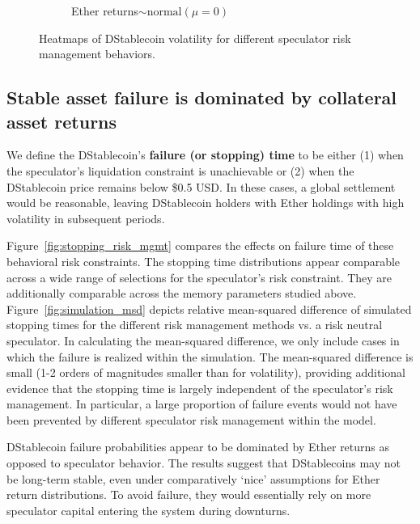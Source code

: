 \begin{figure}
\begin{subfigure}[b]{0.49\textwidth}
		\caption{Ether returns$\sim\text{normal}(\mu=0)$}\label{fig:hist_vol_risk_mgmt_normal}
	\end{subfigure}
	\caption{Heatmaps of DStablecoin volatility for different speculator risk management behaviors.}\label{fig:vol_risk_mgmt}
\end{figure}






\subsection{Stable asset failure is dominated by collateral asset returns}
We define the DStablecoin's \textbf{failure (or stopping) time} to be either (1) when the speculator's liquidation constraint is unachievable or (2) when the DStablecoin price remains below \$0.5 USD. In these cases, a global settlement would be reasonable, leaving DStablecoin holders with Ether holdings with high volatility in subsequent periods.

Figure~\ref{fig:stopping_risk_mgmt} compares the effects on failure time of these behavioral risk constraints. The stopping time distributions appear comparable across a wide range of selections for the speculator's risk constraint. They are additionally comparable across the memory parameters studied above. Figure~\ref{fig:simulation_msd} depicts relative mean-squared difference of simulated stopping times for the different risk management methods vs. a risk neutral speculator. In calculating the mean-squared difference, we only include cases in which the failure is realized within the simulation. The mean-squared difference is small (1-2 orders of magnitudes smaller than for volatility), providing additional evidence that the stopping time is largely independent of the speculator's risk management. In particular, a large proportion of failure events would not have been prevented by different speculator risk management within the model.

DStablecoin failure probabilities appear to be dominated by Ether returns as opposed to speculator behavior. The results suggest that DStablecoins may not be long-term stable, even under comparatively `nice' assumptions for Ether return distributions. To avoid failure, they would essentially rely on more speculator capital entering the system during downturns.


